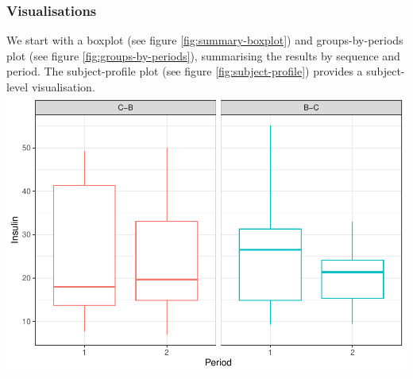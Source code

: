 \begin{table}
\centering
\caption{\label{tab:table1}Summary Table}
\centering
{}
\end{table}

\subsubsection{Visualisations}\label{visualisations}

We start with a boxplot (see figure \ref{fig:summary-boxplot}) and
groups-by-periods plot (see figure \ref{fig:groups-by-periods}),
summarising the results by sequence and period. The subject-profile plot
(see figure \ref{fig:subject-profile}) provides a subject-level
visualisation.
\includegraphics{ch4_files/figure-latex/summary-boxplot-1.pdf}

